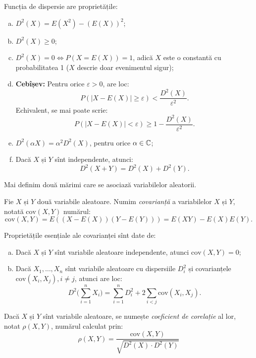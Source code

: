 Funcția de dispersie are proprietățile:
\begin{enumerate}[(a)]
\item $ D^2(X) = E(X^2) - (E(X))^2 $;
\item $ D^2(X) \geq 0 $;
\item $ D^2(X) = 0 \Leftrightarrow P(X = E(X)) = 1 $, adică $ X $ este o constantă cu
  probabilitatea 1 ($ X $ descrie doar evenimentul sigur);
\item \textbf{Cebîșev:} Pentru orice $ \varepsilon > 0 $, are loc:
  \[
    P(|X - E(X)| \geq \varepsilon) < \frac{D^2(X)}{\varepsilon^2}. 
  \]
  Echivalent, se mai poate scrie:
  \[
    P(|X - E(X)| < \varepsilon) \geq 1 - \frac{D^2(X)}{\varepsilon^2}.
  \]
\item $ D^2(\alpha X) = \alpha^2 D^2(X) $, pentru orice $ \alpha \in \mathbb{C} $;
\item Dacă $ X $ și $ Y $ sînt independente, atunci:
  \[
    D^2(X + Y) = D^2(X) + D^2(Y).
  \]
\end{enumerate}

Mai definim două mărimi care se asociază variabilelor aleatorii.

\begin{definition}\label{def:cov}
  Fie $ X $ și $ Y $ două variabile aleatoare. Numim \emph{covarianță} a
  variabilelor $ X $ și $ Y $, notată $ \mathrm{cov}(X, Y) $ numărul:
  \[
    \mathrm{cov}(X, Y) = E((X - E(X))(Y - E(Y))) = E(XY) - E(X)E(Y).
  \]
\end{definition}

Proprietățile esențiale ale covarianței sînt date de:
\begin{enumerate}[(a)]
\item Dacă $ X $ și $ Y $ sînt variabile aleatoare independente, atunci
  $ \mathrm{cov}(X, Y) = 0 $;
\item Dacă $ X_1, \dots, X_n $ sînt variabile aleatoare cu dispersiile
  $ D_i^2 $ și covarianțele $ \mathrm{cov}(X_i, X_j), i \neq j $, atunci are loc:
  \[
    D^2\Big( \sum_{i = 1}^n X_i \Big) = \sum_{i = 1}^n D_i^2 + %
    2 \sum_{i < j} \mathrm{cov}(X_i, X_j).
  \]
\end{enumerate}

\begin{definition}\label{def:cor}
  Dacă $ X $ și $ Y $ sînt variabile aleatoare, se numește \emph{coeficient de corelație}
  al lor, notat $ \rho(X, Y) $, numărul calculat prin:
  \[
    \rho(X, Y) = \frac{\mathrm{cov}(X, Y)}{\sqrt{D^2(X) \cdot D^2(Y)}}
  \]
\end{definition}

